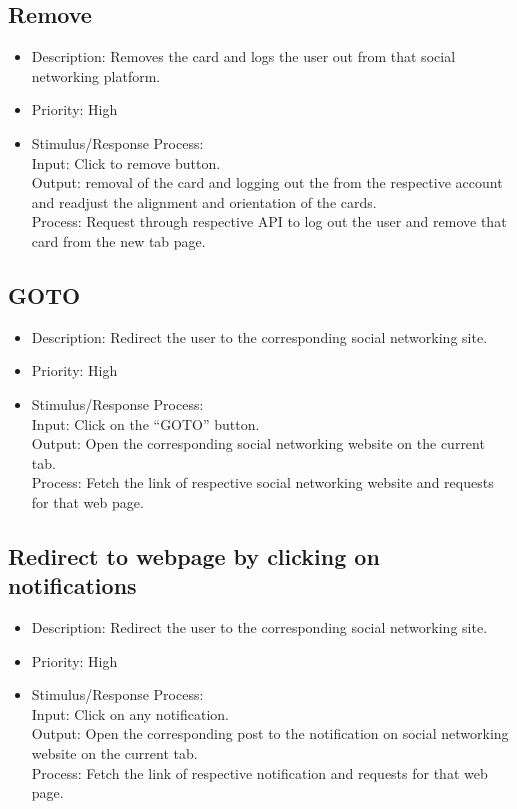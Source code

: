 \documentclass[12pt]{article}
\begin{document}
\subsection{Remove}
\begin{itemize}
    \item Description: Removes the card and logs the user out from that
social networking platform.
    \item Priority: High
    \item 
Stimulus/Response Process:\\
Input: Click to remove button.\\
Output: removal of the card and logging out the from the
respective account and readjust the alignment and
orientation of the cards.\\
Process: Request through respective API to log out the
user and remove that card from the new tab page.
\end{itemize}

\subsection{GOTO}
\begin{itemize}
    \item Description: Redirect the user to the corresponding social
networking site.
 
    \item  Priority: High

    \item 
Stimulus/Response Process:\\

Input: Click on the “GOTO” button.\\
Output: Open the corresponding social networking
website on the current tab.\\
Process: Fetch the link of respective social networking
website and requests for that web page. 
\end{itemize}

\subsection{Redirect to webpage by clicking on notifications}
\begin{itemize}
    \item  Description: Redirect the user to the corresponding social
networking site.
    \item  Priority: High
    \item 
 Stimulus/Response Process:\\
Input: Click on any notification.\\
Output: Open the corresponding post to the notification
on social networking website on the current tab.\\
Process: Fetch the link of respective notification and
requests for that web page.
\end{itemize}
\end{document}
